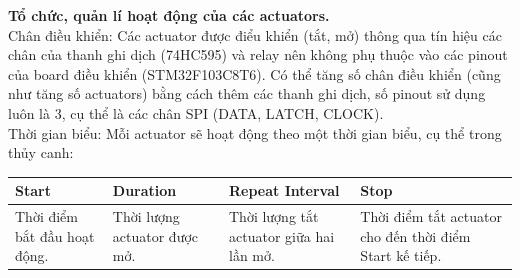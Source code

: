 \documentclass[a4paper,12pt,oneside]{article}
\begin{document}
\noindent \textbf{Tổ chức, quản lí hoạt động của các actuators.}\\
\noindent Chân điều khiển: Các actuator được điểu khiển (tắt, mở) thông qua tín hiệu các chân của thanh ghi dịch (74HC595) và relay nên không phụ thuộc vào các pinout của board điều khiển (STM32F103C8T6). Có thể tăng số chân điều khiển (cũng như tăng số actuators) bằng cách thêm các thanh ghi dịch, số pinout sử dụng luôn là 3, cụ thể là các chân SPI (DATA, LATCH, CLOCK).\\
\noindent Thời gian biểu: Mỗi actuator sẽ hoạt động theo một thời gian biểu, cụ thể trong thủy canh:

\begin{center}
\begin{tabularx}{\linewidth}{ |X|X|X|X| }
\hline
Start & Duration & Repeat Interval & Stop\\
\hline
Thời điểm bắt đầu hoạt động. & Thời lượng actuator được mở. & Thời lượng tắt actuator giữa hai lần mở. & Thời điểm tắt actuator cho đến thời điểm Start kế tiếp.\\
\hline
\end{tabularx}
\end{center}
\end{document}
